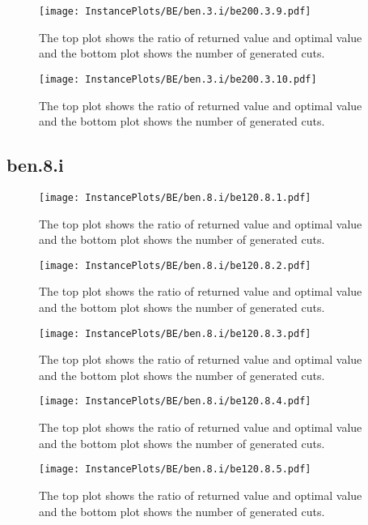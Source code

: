 \documentclass[10pt,a4paper]{article}
\begin{document}
\begin{figure}[H]
\texttt{[image: InstancePlots/BE/ben.3.i/be200.3.9.pdf]}
\caption{The top plot shows the ratio of returned value and optimal value     and the bottom plot shows the number of generated cuts.}
\end{figure}

\begin{figure}[H]
\texttt{[image: InstancePlots/BE/ben.3.i/be200.3.10.pdf]}
\caption{The top plot shows the ratio of returned value and optimal value     and the bottom plot shows the number of generated cuts.}
\end{figure}

\subsection{ben.8.i}
\begin{figure}[H]
\texttt{[image: InstancePlots/BE/ben.8.i/be120.8.1.pdf]}
\caption{The top plot shows the ratio of returned value and optimal value     and the bottom plot shows the number of generated cuts.}
\end{figure}

\begin{figure}[H]
\texttt{[image: InstancePlots/BE/ben.8.i/be120.8.2.pdf]}
\caption{The top plot shows the ratio of returned value and optimal value     and the bottom plot shows the number of generated cuts.}
\end{figure}

\begin{figure}[H]
\texttt{[image: InstancePlots/BE/ben.8.i/be120.8.3.pdf]}
\caption{The top plot shows the ratio of returned value and optimal value     and the bottom plot shows the number of generated cuts.}
\end{figure}

\begin{figure}[H]
\texttt{[image: InstancePlots/BE/ben.8.i/be120.8.4.pdf]}
\caption{The top plot shows the ratio of returned value and optimal value     and the bottom plot shows the number of generated cuts.}
\end{figure}

\begin{figure}[H]
\texttt{[image: InstancePlots/BE/ben.8.i/be120.8.5.pdf]}
\caption{The top plot shows the ratio of returned value and optimal value     and the bottom plot shows the number of generated cuts.}
\end{figure}
\end{document}
